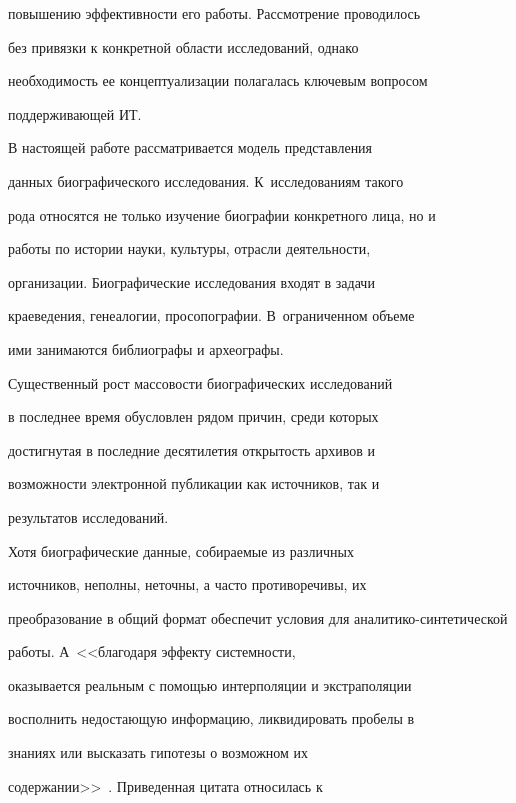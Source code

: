 повышению эффективности его работы.  Рас\-смот\-ре\-ние проводилось 


без привязки к конкретной области исследований, однако 


необходимость ее концептуализации полагалась ключевым вопросом 


поддерживающей ИТ. 


     


     В настоящей работе рассматривается модель представления 


данных биографического исследования. К~исследованиям такого 


рода относятся не только изучение биографии конкретного лица, но и 


работы по истории науки, культуры, отрасли деятельности, 


организации. Биографические исследования входят в задачи 


краеведения, генеалогии, просопографии. В~ограниченном объеме 


ими занимаются библиографы и археографы.  


     


     Существенный рост массовости биографических исследований 


в последнее время обусловлен рядом причин, среди которых 


достигнутая в последние десятилетия открытость архивов и 


возможности электронной публикации как источников, так и 


результатов исследований. 


     


     Хотя биографические данные, собираемые из различных 


источников,  неполны, неточны, а часто противоречивы, их 


преобразование в общий формат обеспечит условия для аналитико-синтетической 


работы. А~<<благодаря эффекту системности, 


оказывается реальным с помощью интерполяции и экстраполяции 


восполнить недостающую информацию, ликвидировать пробелы в 


знаниях или высказать гипотезы о возможном их 


содержании>>~\cite{3-2-12}.  Приведенная цитата относилась к 


